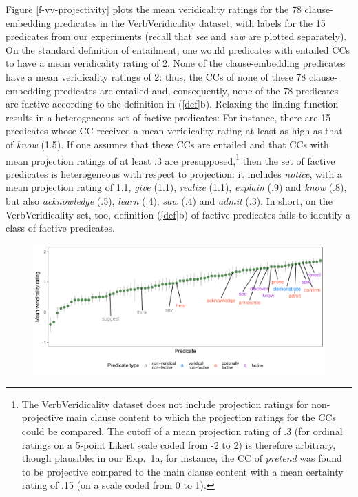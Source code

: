 \documentclass[11pt,fleqn]{article}
\newcommand{\6}{\mbox{$[\hspace*{-.6mm}[$}}
\newcommand{\9}{\mbox{$]\hspace*{-.6mm}]$}}
\begin{document}
{Figure \ref{f-vv-projectivity} plots the mean veridicality ratings for the 78 clause-embedding predicates in the VerbVeridicality dataset, with labels for the 15 predicates from our experiments (recall that {\em see} and {\em saw} are plotted separately). On the standard definition of entailment, one would predicates with entailed CCs to have a mean veridicality rating of 2. None of the clause-embedding predicates have a mean veridicality ratings of 2: thus, the CCs of none of these 78 clause-embedding predicates are entailed and, consequently, none of the 78 predicates are factive according to the definition in (\ref{def}b). Relaxing the linking function results in a heterogeneous set of factive predicates: For instance, there are 15 predicates whose CC received a mean veridicality rating at least as high as that of {\em know} (1.5). If one assumes that these CCs are entailed and that CCs with mean projection ratings of at least .3 are presupposed,\footnote{The VerbVeridicality dataset does not include projection ratings for non-projective main clause content to which the projection ratings for the CCs could be compared. The cutoff of a mean projection rating of .3 (for ordinal ratings on a 5-point Likert scale coded from -2 to 2) is therefore arbitrary, though plausible: in our Exp.~1a, for instance, the CC of {\em pretend} was found to be projective compared to the main clause content with a mean certainty rating of .15 (on a scale coded from 0 to 1).} then the set of factive predicates is heterogeneous with respect to projection: it includes {\em notice}, with a mean projection rating of 1.1, {\em give} (1.1), {\em realize} (1.1), {\em explain} (.9) and {\em know} (.8), but also {\em acknowledge} (.5), {\em learn} (.4), {\em saw} (.4) and {\em admit} (.3). In short, on the VerbVeridicality set, too, definition (\ref{def}b) of factive predicates fails to identify a class of factive predicates.

\begin{figure}[H]
\centering
\includegraphics[width=.77\paperwidth]{../../VerbVeridicality-analysis/graphs/means-entailment-by-predicate}


\end{figure}}
\end{document}
